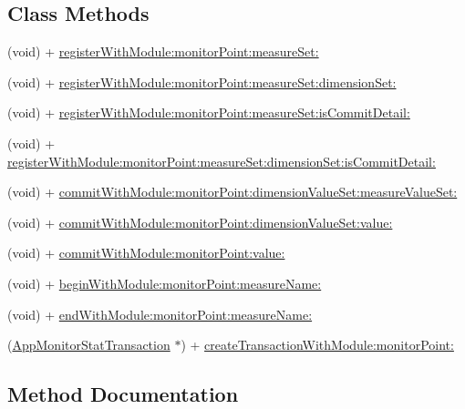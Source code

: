 \subsection*{Class Methods}
\begin{DoxyCompactItemize}
\item 
(void) + \mbox{\hyperlink{interface_app_monitor_stat_a5e5ba297ca1224ae6a584dc1ade19fed}{register\+With\+Module\+:monitor\+Point\+:measure\+Set\+:}}
\item 
(void) + \mbox{\hyperlink{interface_app_monitor_stat_a65e08448b55942dc6c176aae47cd21b3}{register\+With\+Module\+:monitor\+Point\+:measure\+Set\+:dimension\+Set\+:}}
\item 
(void) + \mbox{\hyperlink{interface_app_monitor_stat_a98113174838b140dc6ced0e89dd62b50}{register\+With\+Module\+:monitor\+Point\+:measure\+Set\+:is\+Commit\+Detail\+:}}
\item 
(void) + \mbox{\hyperlink{interface_app_monitor_stat_aa423e474af943903df6c1f50f0d75bb8}{register\+With\+Module\+:monitor\+Point\+:measure\+Set\+:dimension\+Set\+:is\+Commit\+Detail\+:}}
\item 
(void) + \mbox{\hyperlink{interface_app_monitor_stat_ab0f49bd48da1dfc4764a13b2f7272955}{commit\+With\+Module\+:monitor\+Point\+:dimension\+Value\+Set\+:measure\+Value\+Set\+:}}
\item 
(void) + \mbox{\hyperlink{interface_app_monitor_stat_ad693c34524d4c06ac2f5b069c7405be4}{commit\+With\+Module\+:monitor\+Point\+:dimension\+Value\+Set\+:value\+:}}
\item 
(void) + \mbox{\hyperlink{interface_app_monitor_stat_a746f48f3281128d7c7a5f69760df04cc}{commit\+With\+Module\+:monitor\+Point\+:value\+:}}
\item 
(void) + \mbox{\hyperlink{interface_app_monitor_stat_a78b877a3582ac16af52f7662d481aa80}{begin\+With\+Module\+:monitor\+Point\+:measure\+Name\+:}}
\item 
(void) + \mbox{\hyperlink{interface_app_monitor_stat_a04ad81ce6e45c4f30e559a1eb5b1af92}{end\+With\+Module\+:monitor\+Point\+:measure\+Name\+:}}
\item 
(\mbox{\hyperlink{interface_app_monitor_stat_transaction}{App\+Monitor\+Stat\+Transaction}} $\ast$) + \mbox{\hyperlink{interface_app_monitor_stat_ae10430c2e4ba64d17bff4ecb8e606f01}{create\+Transaction\+With\+Module\+:monitor\+Point\+:}}
\end{DoxyCompactItemize}


\subsection{Method Documentation}
\mbox{\label{interface_app_monitor_stat_a78b877a3582ac16af52f7662d481aa80}} 
